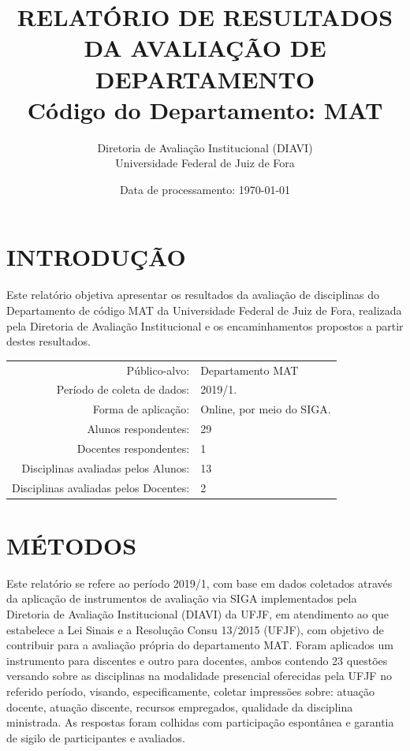 \documentclass[a4paper,10pt]{article}
\date{Data de processamento: \today}
\begin{document}
\author{Diretoria de Avaliação Institucional (DIAVI) \\ Universidade Federal de Juiz de Fora}

\title{RELATÓRIO DE RESULTADOS DA AVALIAÇÃO DE DEPARTAMENTO\\ Código do Departamento: MAT}
\maketitle
\section{INTRODUÇÃO}
Este relatório objetiva apresentar os resultados da avaliação de disciplinas do Departamento     de código MAT da Universidade Federal de Juiz de Fora, realizada pela     Diretoria de Avaliação Institucional e os encaminhamentos propostos a     partir destes resultados.

\begin{center}
\begin{tabularx}{\linewidth}{r|X}

Público-alvo:& Departamento  MAT\\

Período de coleta de dados:& 2019/1.\\

Forma de aplicação:& Online, por meio do SIGA.\\

Alunos   respondentes:& 29\\

Docentes respondentes:& 1\\

Disciplinas avaliadas pelos   Alunos:& 13\\

Disciplinas avaliadas pelos Docentes:& 2\\
\end{tabularx}
\end{center}

\section{MÉTODOS}
Este relatório se refere ao período 2019/1, com base em dados     coletados através da aplicação de instrumentos de avaliação via SIGA     implementados pela Diretoria de Avaliação Institucional (DIAVI) da UFJF, em atendimento     ao que estabelece a Lei Sinais e a Resolução Consu 13/2015 (UFJF),     com objetivo de contribuir para a avaliação própria do departamento MAT.    Foram aplicados um instrumento para discentes e outro para docentes, ambos contendo     23 questões versando sobre as disciplinas na modalidade presencial oferecidas pela UFJF no     referido período, visando, especificamente, coletar impressões sobre: atuação docente, atuação discente,     recursos empregados, qualidade da disciplina ministrada.     As respostas foram colhidas      com participação espontânea e garantia de    sigilo de participantes e avaliados.
\end{document}
